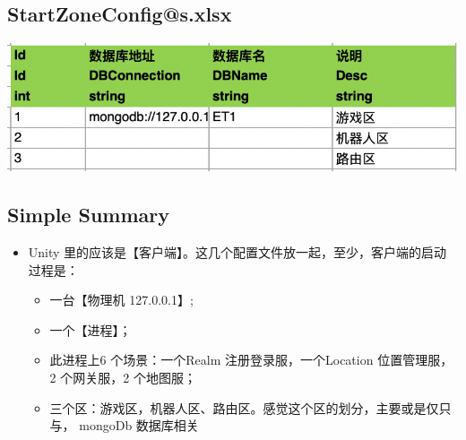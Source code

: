 \documentclass[9pt, b5paper]{article}
\begin{document}
\subsection{StartZoneConfig@s.xlsx}
\label{sec-1-4}

\includegraphics[width=.9\linewidth]{./pic/et6_20231219_111620.png}
\subsection{Simple Summary}
\label{sec-1-5}
\begin{itemize}
\item Unity 里的应该是【客户端】。这几个配置文件放一起，至少，客户端的启动过程是：
\begin{itemize}
\item 一台【物理机 127.0.0.1】;
\item 一个【进程】；
\item 此进程上6 个场景：一个Realm 注册登录服，一个Location 位置管理服，2 个网关服，2 个地图服；
\item 三个区：游戏区，机器人区、路由区。感觉这个区的划分，主要或是仅只与， mongoDb 数据库相关
\end{itemize}
\end{itemize}
\end{document}
